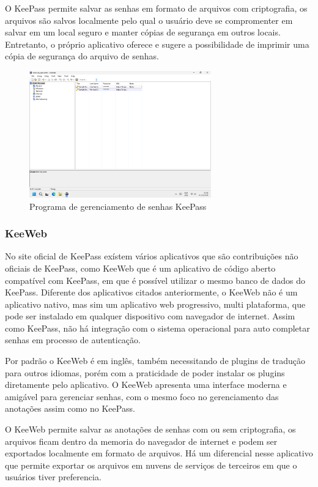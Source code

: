\documentclass[12pt]{article}
\begin{document}
O KeePass permite salvar as senhas em formato de arquivos com criptografia, os arquivos
são salvos localmente pelo qual o usuário deve se compromenter em salvar em um local
seguro e manter cópias de segurança em outros locais.
Entretanto, o próprio aplicativo oferece e sugere a possibilidade de imprimir uma cópia
de segurança do arquivo de senhas.

\begin{figure}[h!]
  \centering
  \includegraphics[width=0.7\textwidth]{./assets/keepass.png}
  \caption{Programa de gerenciamento de senhas KeePass}
  \label{fig:KeePass}
\end{figure}

\subsubsection{KeeWeb}

No site oficial de KeePass exístem vários aplicativos que são contribuições não oficiais
de KeePass, como KeeWeb que é um aplicativo de código aberto compatível com KeePass, em
que é possível utilizar o mesmo banco de dados do KeePass.
Diferente dos aplicativos citados anteriormente, o KeeWeb não é um aplicativo
nativo, mas sim um aplicativo web progressivo, multi plataforma, que pode ser instalado
em qualquer dispositivo com navegador de internet.
Assim como KeePass, não há integração com o sistema operacional para auto completar senhas
em processo de autenticação.

Por padrão o KeeWeb é em inglês, também necessitando de plugins de tradução para outros
idiomas, porém com a praticidade de poder instalar os plugins diretamente pelo aplicativo.
O KeeWeb apresenta uma interface moderna e amigável para gerenciar senhas, com o mesmo foco
no gerenciamento das anotações assim como no KeePass.

O KeeWeb permite salvar as anotações de senhas com ou sem criptografia, os arquivos ficam
dentro da memoria do navegador de internet e podem ser exportados localmente em formato de
arquivos.
Há um diferencial nesse aplicativo que permite exportar os arquivos em nuvens de serviços
de terceiros em que o usuários tiver preferencia.
\end{document}
